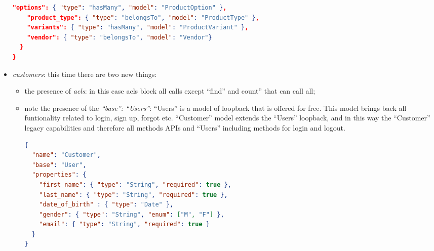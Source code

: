 \begin{itemize}
\begin{lstlisting}[language=json]
    "options": { "type": "hasMany", "model": "ProductOption" },
    "product_type": { "type": "belongsTo", "model": "ProductType" },
    "variants": { "type": "hasMany", "model": "ProductVariant" },
    "vendor": { "type": "belongsTo", "model": "Vendor"}
  }
}
\end{lstlisting}
\item \emph{customers}: this time there are two new things:
\begin{itemize}
\item the presence of \emph{acls}: in this case acls block all calls except “find” and count” that can call all;
\item note the presence of the \emph{“base”: “Users”}: “Users” is a model of loopback that is offered for free. This model brings back all funtionality related to login, sign up, forgot etc. “Customer” model extends the “Users” loopback, and in this way the “Customer” legacy capabilities and therefore all methods APIs and “Users” including methods for login and logout.
\begin{lstlisting}[language=json]
{
  "name": "Customer",
  "base": "User",
  "properties": {
    "first_name": { "type": "String", "required": true },
    "last_name": { "type": "String", "required": true },
    "date_of_birth" : { "type": "Date" },
    "gender": { "type": "String", "enum": ["M", "F"] },
    "email": { "type": "String", "required": true }
  }
}
\end{lstlisting}
\end{itemize}
\end{itemize}


